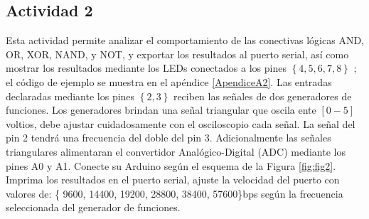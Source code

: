 \subsection{Actividad 2}

Esta actividad permite analizar el comportamiento de las conectivas lógicas  AND, OR, XOR, NAND, y NOT, y exportar los resultados al puerto serial, así como mostrar los resultados mediante los LEDs conectados a los pines $\left\lbrace4, 5, 6, 7, 8 \right\rbrace$ ; el código de ejemplo se muestra en el apéndice \ref{ApendiceA2}. Las entradas declaradas mediante los pines $\left\lbrace2, 3 \right\rbrace$ reciben las señales de dos generadores de funciones. Los generadores brindan una señal triangular que oscila ente $[0-5]$ voltios, debe ajustar cuidadosamente con el osciloscopio cada señal. La señal del pin 2 tendrá una frecuencia del doble del pin 3. Adicionalmente las señales  triangulares alimentaran el convertidor Analógico-Digital (ADC) mediante los pines A0 y A1. Conecte su Arduino según el esquema de la Figura \ref{fig:fig2}.  Imprima los resultados en el puerto serial, ajuste la velocidad del puerto con valores de: \{ 9600, 14400, 19200, 28800, 38400, 57600\}bps según la frecuencia seleccionada del generador de funciones.


